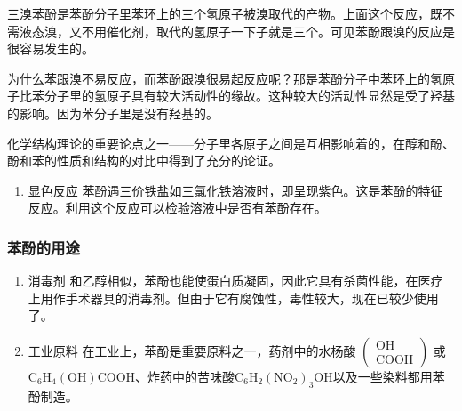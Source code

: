 \begin{figure}
{%
}


\end{figure}

三溴苯酚是苯酚分子里苯环上的三个氢原子被溴取代的产物。上面这个反应，既不需液态溴，又不用催化剂，取代的氢原子一下子就是三个。可见苯酚跟溴的反应是很容易发生的。

为什么苯跟溴不易反应，而苯酚跟溴很易起反应呢？那是苯酚分子中苯环上的氢原子比苯分子里的氢原子具有较大活动性的缘故。这种较大的活动性显然是受了羟基的影响。因为苯分子里是没有羟基的。

化学结构理论的重要论点之一------分子里各原子之间是互相影响着的，在醇和酚、酚和苯的性质和结构的对比中得到了充分的论证。

\begin{enumerate}[start=4]
\item
  显色反应
  苯酚遇三价铁盐如三氯化铁溶液时，即呈现紫色。这是苯酚的特征反应。利用这个反应可以检验溶液中是否有苯酚存在。
\end{enumerate}

\subsubsection{苯酚的用途}

\begin{enumerate}
\item
  消毒剂
  和乙醇相似，苯酚也能使蛋白质凝固，因此它具有杀菌性能，在医疗上用作手术器具的消毒剂。但由于它有腐蚀性，毒性较大，现在已较少使用了。
\item
  工业原料 在工业上，苯酚是重要原料之一，药剂中的水杨酸
  \(\left(\begin{array}{c}\text{OH}\\\text{COOH}\end{array}\right)\) 或
  \(\mathrm{C}_{6}\mathrm{H}_{4}(\mathrm{OH})\mathrm{COOH}\)、炸药中的苦味酸\(\mathrm{C}_{6}\mathrm{H}_{2}(\mathrm{NO}_{2})_{3}\mathrm{OH}\)以及一些染料都用苯酚制造。
\end{enumerate}

